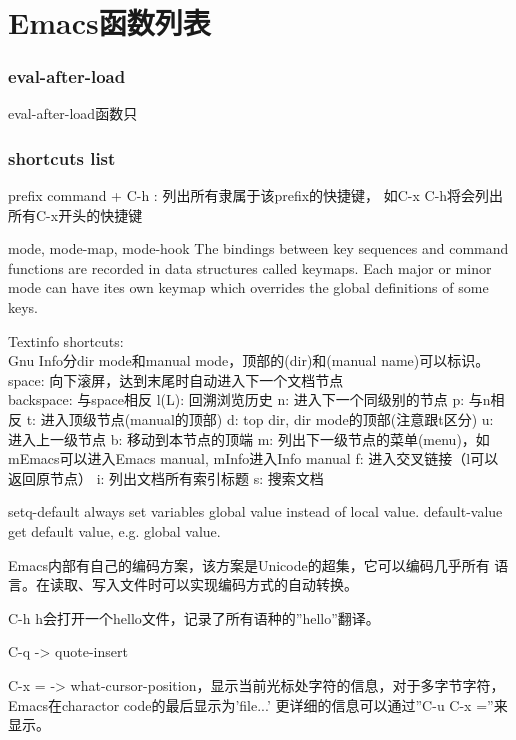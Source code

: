 ﻿\documentclass[a4paper,11pt]{article}
\begin{document}
  \tt %
  \pagestyle{header}
  \sybmaketitle
  \tableofcontents
  \newpage

  \pagestyle{main}
  \setcounter{page}{1}
  
  \part[Emacs函数列表]{Emacs函数列表}
  \section[eval-after-load]{eval-after-load}
  eval-after-load函数只

  \section[shortcuts list]{shortcuts list}
  prefix command + C-h : 列出所有隶属于该prefix的快捷键，
  如C-x C-h将会列出所有C-x开头的快捷键

  mode, mode-map, mode-hook
  The bindings between key sequences and command functions are recorded in data structures called keymaps.
  Each major or minor mode can have ites own keymap which overrides the global definitions of some keys.

  Textinfo shortcuts:\\
  Gnu Info分dir mode和manual mode，顶部的(dir)和(manual name)可以标识。
  space: 向下滚屏，达到末尾时自动进入下一个文档节点\\
  backspace: 与space相反
  l(L): 回溯浏览历史
  n: 进入下一个同级别的节点
  p: 与n相反
  t: 进入顶级节点(manual的顶部)
  d: top dir, dir mode的顶部(注意跟t区分)
  u: 进入上一级节点
  b: 移动到本节点的顶端
  m: 列出下一级节点的菜单(menu)，如mEmacs可以进入Emacs manual, mInfo进入Info manual
  f: 进入交叉链接（l可以返回原节点）
  i: 列出文档所有索引标题
  s: 搜索文档

  setq-default always set variables global value instead of local value.
  default-value get default value, e.g. global value.

  Emacs内部有自己的编码方案，该方案是Unicode的超集，它可以编码几乎所有
  语言。在读取、写入文件时可以实现编码方式的自动转换。

  C-h h会打开一个hello文件，记录了所有语种的''hello''翻译。

  C-q -> quote-insert

  C-x = -> what-cursor-position，显示当前光标处字符的信息，对于多字节字符，
  Emacs在charactor code的最后显示为'file...'
  更详细的信息可以通过''C-u C-x =''来显示。
\end{document}

